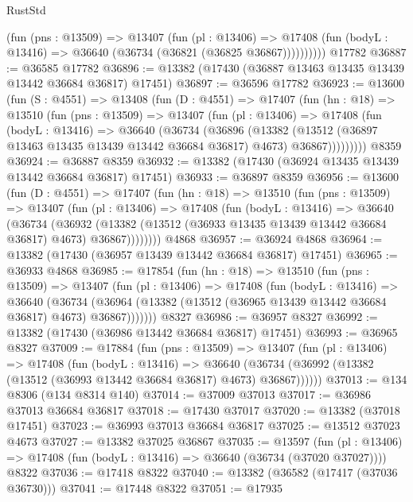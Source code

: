 \begin{lexlean}{RustStd}
\begin{coremodule}
            (fun (pns : @13509) =>
            @13407
              (fun (pl : @13406) =>
              @17408 (fun (bodyL : @13416) => @36640 (@36734 (@36821 (@36825 @36867))))))))))
    @17782
@36887 := @36585 @17782
@36896 := @13382 (@17430 (@36887 @13463 @13435 @13439 @13442 @36684 @36817) @17451)
@36897 := @36596 @17782
@36923 := @13600
    (fun (S : @4551) =>
    @13408
      (fun (D : @4551) =>
      @17407
        (fun (hn : @18) =>
        @13510
          (fun (pns : @13509) =>
          @13407
            (fun (pl : @13406) =>
            @17408
              (fun (bodyL : @13416) =>
              @36640
                (@36734
                  (@36896
                    (@13382
                      (@13512 (@36897 @13463 @13435 @13439 @13442 @36684 @36817) @4673)
                      @36867)))))))))
    @8359
@36924 := @36887 @8359
@36932 := @13382 (@17430 (@36924 @13435 @13439 @13442 @36684 @36817) @17451)
@36933 := @36897 @8359
@36956 := @13600
    (fun (D : @4551) =>
    @17407
      (fun (hn : @18) =>
      @13510
        (fun (pns : @13509) =>
        @13407
          (fun (pl : @13406) =>
          @17408
            (fun (bodyL : @13416) =>
            @36640
              (@36734
                (@36932
                  (@13382 (@13512 (@36933 @13435 @13439 @13442 @36684 @36817) @4673) @36867))))))))
    @4868
@36957 := @36924 @4868
@36964 := @13382 (@17430 (@36957 @13439 @13442 @36684 @36817) @17451)
@36965 := @36933 @4868
@36985 := @17854
    (fun (hn : @18) =>
    @13510
      (fun (pns : @13509) =>
      @13407
        (fun (pl : @13406) =>
        @17408
          (fun (bodyL : @13416) =>
          @36640
            (@36734
              (@36964 (@13382 (@13512 (@36965 @13439 @13442 @36684 @36817) @4673) @36867)))))))
    @8327
@36986 := @36957 @8327
@36992 := @13382 (@17430 (@36986 @13442 @36684 @36817) @17451)
@36993 := @36965 @8327
@37009 := @17884
    (fun (pns : @13509) =>
    @13407
      (fun (pl : @13406) =>
      @17408
        (fun (bodyL : @13416) =>
        @36640 (@36734 (@36992 (@13382 (@13512 (@36993 @13442 @36684 @36817) @4673) @36867))))))
@37013 := @134 @8306 (@134 @8314 @140)
@37014 := @37009 @37013
@37017 := @36986 @37013 @36684 @36817
@37018 := @17430 @37017
@37020 := @13382 (@37018 @17451)
@37023 := @36993 @37013 @36684 @36817
@37025 := @13512 @37023 @4673
@37027 := @13382 @37025 @36867
@37035 := @13597
    (fun (pl : @13406) => @17408 (fun (bodyL : @13416) => @36640 (@36734 (@37020 @37027))))
    @8322
@37036 := @17418 @8322
@37040 := @13382 (@36582 (@17417 (@37036 @36730)))
@37041 := @17448 @8322
@37051 := @17935

\end{coremodule}
\end{lexlean}
